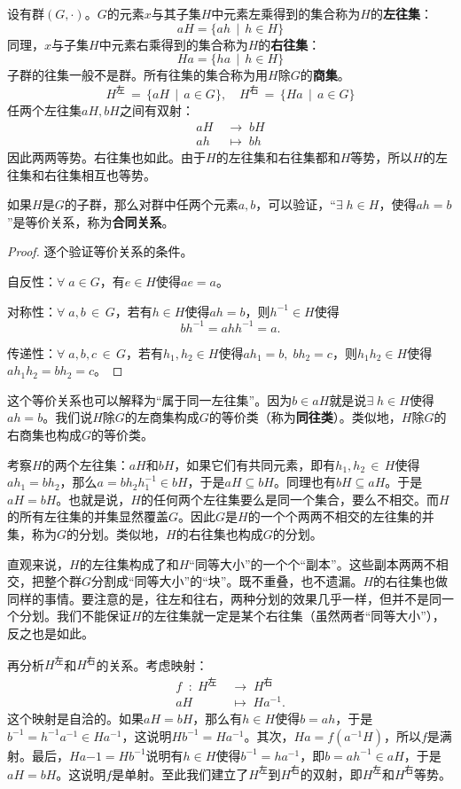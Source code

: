 \documentclass[12pt,UTF8,fontset=none]{ctexbook}
\begin{document}
设有群$(G,\cdot)$。$G$的元素$x$与其子集$H$中元素左乘得到的集合称为$H$的\textbf{左往集}：
$$ aH = \{ ah \, \mid \, h\in H \}$$
同理，$x$与子集$H$中元素右乘得到的集合称为$H$的\textbf{右往集}：
$$ Ha = \{ ha \, \mid \, h\in H \}$$
子群的往集一般不是群。所有往集的集合称为用$H$除$G$的\textbf{商集}。
$$ H^{\text{左}} \, = \, \{aH \, \mid \, a \in G \}, \quad H^{\text{右}} \, = \, \{Ha \, \mid \, a \in G \}$$
任两个左往集$aH, bH$之间有双射：
\begin{align*}
    aH \; &\longrightarrow \; bH \\
    ah \; &\longmapsto \; bh
\end{align*}
因此两两等势。右往集也如此。由于$H$的左往集和右往集都和$H$等势，所以$H$的左往集和右往集相互也等势。

如果$H$是$G$的子群，那么对群中任两个元素$a,b$，可以验证，“$\exists \;h\in H$，使得$ah = b$”是等价关系，称为\textbf{合同关系}。
\begin{proof}
    逐个验证等价关系的条件。
    
    自反性：$\forall \; a\in G$，有$e\in H$使得$ae = a$。

    对称性：$\forall \; a,b\,\in\, G$，若有$h\in H$使得$ah = b$，则$h^{-1}\in H$使得
    $$bh^{-1} = ahh^{-1} = a.$$

    传递性：$\forall \; a,b,c\,\in\, G$，若有$h_1,h_2\in H$使得$ah_1 = b,\;bh_2 = c$，则$h_1h_2\in H$使得$ah_1h_2 = bh_2 = c$。
\end{proof}

这个等价关系也可以解释为“属于同一左往集”。因为$b\in aH$就是说$\exists \; h\in H$使得$ah = b$。我们说$H$除$G$的左商集构成$G$的等价类（称为\textbf{同往类}）。类似地，$H$除$G$的右商集也构成$G$的等价类。

考察$H$的两个左往集：$aH$和$bH$，如果它们有共同元素，即有$h_1, h_2\,\in\, H$使得$ah_1 = bh_2$，那么$a = bh_2h_1^{-1} \in bH$，于是$aH\subseteq bH$。同理也有$bH \subseteq aH$。于是$aH = bH$。也就是说，$H$的任何两个左往集要么是同一个集合，要么不相交。而$H$的所有左往集的并集显然覆盖$G$。因此$G$是$H$的一个个两两不相交的左往集的并集，称为$G$的分划。类似地，$H$的右往集也构成$G$的分划。

直观来说，$H$的左往集构成了和$H$“同等大小”的一个个“副本”。这些副本两两不相交，把整个群$G$分割成“同等大小”的“块”。既不重叠，也不遗漏。$H$的右往集也做同样的事情。要注意的是，往左和往右，两种分划的效果几乎一样，但并不是同一个分划。我们不能保证$H$的左往集就一定是某个右往集（虽然两者“同等大小”），反之也是如此。

再分析$H^{\text{左}}$和$H^{\text{右}}$的关系。考虑映射：
\begin{align*}
    f \;\; : \; H^{\text{左}}\; &\longrightarrow \; H^{\text{右}} \\
    aH \; & \longmapsto \; Ha^{-1}.
\end{align*}
这个映射是自洽的。如果$aH = bH$，那么有$h\in H$使得$b = ah$，于是$b^{-1} = h^{-1}a^{-1}\in Ha^{-1}$，这说明$Hb^{-1} = Ha^{-1}$。其次，$Ha = f(a^{-1}H)$，所以$f$是满射。最后，$Ha{-1} = Hb^{-1}$说明有$h\in H$使得$b^{-1} = ha^{-1}$，即$b = ah^{-1}\in aH$，于是$aH = bH$。这说明$f$是单射。至此我们建立了$H^{\text{左}}$到$H^{\text{右}}$的双射，即$H^{\text{左}}$和$H^{\text{右}}$等势。
\end{document}
